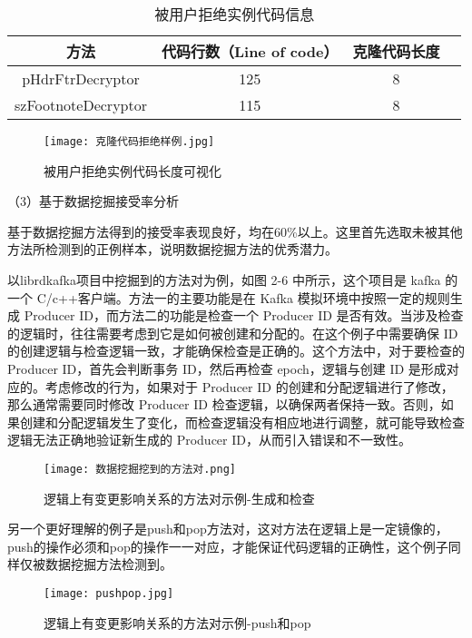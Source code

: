 \clearpage

\begin{table}[htbp]
\caption{被用户拒绝实例代码信息}
\vspace{0.5em}\centering\wuhao
\begin{tabular}{cccc}
\toprule
方法 & 代码行数（Line of code）  & 克隆代码长度\\
\midrule
pHdrFtrDecryptor & 125 & 8 \\
szFootnoteDecryptor  & 115 & 8 \\
\bottomrule
\end{tabular}
\end{table}

\begin{figure}[h]
\centering
\texttt{[image: 克隆代码拒绝样例.jpg]}
\caption{被用户拒绝实例代码长度可视化}
\end{figure}

（3）基于数据挖掘接受率分析

基于数据挖掘方法得到的接受率表现良好，均在60\%以上。这里首先选取未被其他方法所检测到的正例样本，说明数据挖掘方法的优秀潜力。

以librdkafka项目中挖掘到的方法对为例，如图 2-6 中所示，这个项目是 kafka 的一个 C/c++客户端。方法一的主要功能是在 Kafka 模拟环境中按照一定的规则生成 Producer ID，而方法二的功能是检查一个 Producer ID 是否有效。当涉及检查的逻辑时，往往需要考虑到它是如何被创建和分配的。在这个例子中需要确保 ID 的创建逻辑与检查逻辑一致，才能确保检查是正确的。这个方法中，对于要检查的 Producer ID，首先会判断事务 ID，然后再检查 epoch，逻辑与创建 ID 是形成对应的。考虑修改的行为，如果对于 Producer ID 的创建和分配逻辑进行了修改，那么通常需要同时修改 Producer ID 检查逻辑，以确保两者保持一致。否则，如果创建和分配逻辑发生了变化，而检查逻辑没有相应地进行调整，就可能导致检查逻辑无法正确地验证新生成的 Producer ID，从而引入错误和不一致性。

\begin{figure}[h]
\centering
\texttt{[image: 数据挖掘挖到的方法对.png]}
\caption{逻辑上有变更影响关系的方法对示例-生成和检查}
\end{figure}

另一个更好理解的例子是push和pop方法对，这对方法在逻辑上是一定镜像的，push的操作必须和pop的操作一一对应，才能保证代码逻辑的正确性，这个例子同样仅被数据挖掘方法检测到。

\begin{figure}[h]
\centering
\texttt{[image: pushpop.jpg]}
\caption{逻辑上有变更影响关系的方法对示例-push和pop}
\end{figure}

